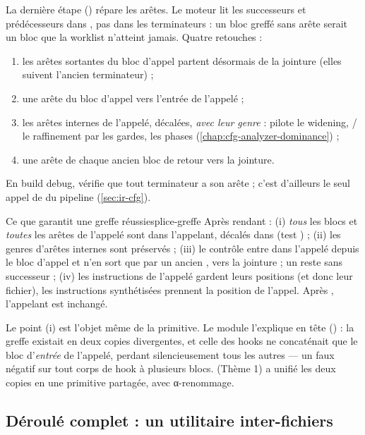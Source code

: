 La dernière étape () répare les arêtes. Le moteur lit les successeurs et prédécesseurs dans , pas dans les terminateurs : un bloc greffé sans arête serait un bloc que la worklist n'atteint jamais. Quatre retouches :
\begin{enumerate}[label=\alph*)]
  \item les arêtes sortantes du bloc d'appel partent désormais de la jointure (elles suivent l'ancien terminateur) ;
  \item une arête  du bloc d'appel vers l'entrée de l'appelé ;
  \item les arêtes internes de l'appelé, décalées, \emph{avec leur genre} :  pilote le widening, / le raffinement par les gardes,  les phases (\cref{chap:cfg-analyzer-dominance}) ;
  \item une arête  de chaque ancien bloc de retour vers la jointure.
\end{enumerate}
En build debug,  vérifie que tout terminateur a son arête ; c'est d'ailleurs le seul appel de  du pipeline (\cref{sec:ir-cfg}).

\begin{invariant}{Ce que garantit une greffe réussie}{splice-greffe}
Après  rendant  : (i) \emph{tous} les blocs et \emph{toutes} les arêtes de l'appelé sont dans l'appelant, décalés dans  (test ) ; (ii) les genres d'arêtes internes sont préservés ; (iii) le contrôle entre dans l'appelé depuis le bloc d'appel et n'en sort que par un ancien , vers la jointure ; un  reste sans successeur ; (iv) les instructions de l'appelé gardent leurs positions (et donc leur fichier), les instructions synthétisées prennent la position de l'appel. Après , l'appelant est inchangé.
\end{invariant}

Le point (i) est l'objet même de la primitive. Le module l'explique en tête () : la greffe existait en deux copies divergentes, et celle des hooks ne concaténait que le bloc d'\emph{entrée} de l'appelé, perdant silencieusement tous les autres --- un faux négatif sur tout corps de hook à plusieurs blocs.  (Thème 1) a unifié les deux copies en une primitive partagée, avec α-renommage.

\subsection{Déroulé complet : un utilitaire inter-fichiers}
\label{sec:splice-deroule}

